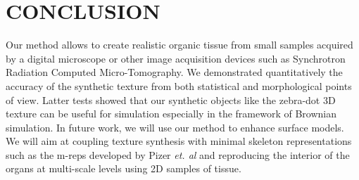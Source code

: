 \section{\uppercase{Conclusion}}
\label{sec:Conclusions}

Our method allows to create realistic organic tissue from small samples acquired by a digital microscope or
other image acquisition devices such as Synchrotron Radiation Computed Micro-Tomography. We demonstrated quantitatively the accuracy of 
the synthetic texture from both statistical and morphological points of view. 
Latter tests showed that our synthetic objects like the zebra-dot 3D texture can be useful for simulation especially in the framework of Brownian simulation. 
In future work, we will use our method to enhance surface models. We will aim at coupling texture synthesis with minimal skeleton 
representations such as the m-reps developed by Pizer \emph{et. al} \cite{Pizer:2003:DMM:945881.945883}
and reproducing the interior of the organs at multi-scale levels using 2D samples of tissue. 
